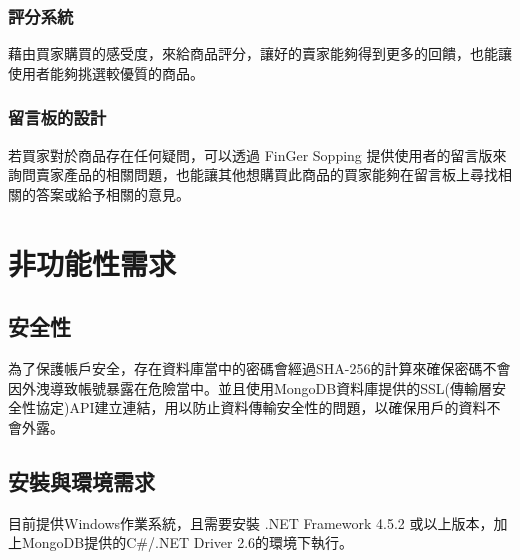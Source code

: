 \documentclass{scrreprt}
\begin{document}
\begin{CJK}{UTF8}{bkai}
\subsection{評分系統}
\qquad 藉由買家購買的感受度，來給商品評分，讓好的賣家能夠得到更多的回饋，也能讓使用者能夠挑選較優質的商品。

\subsection{留言板的設計}
\qquad 若買家對於商品存在任何疑問，可以透過 FinGer Sopping 提供使用者的留言版來詢問賣家產品的相關問題，也能讓其他想購買此商品的買家能夠在留言板上尋找相關的答案或給予相關的意見。

\chapter{非功能性需求}

\section{安全性}
\qquad 為了保護帳戶安全，存在資料庫當中的密碼會經過SHA-256的計算來確保密碼不會因外洩導致帳號暴露在危險當中。並且使用MongoDB資料庫提供的SSL(傳輸層安全性協定)API建立連結，用以防止資料傳輸安全性的問題，以確保用戶的資料不會外露。

\section{安裝與環境需求}
\qquad 目前提供Windows作業系統，且需要安裝 .NET Framework 4.5.2 或以上版本，加上MongoDB提供的C\#/.NET Driver 2.6的環境下執行。
\chapter{}
\end{CJK}
\end{document}

